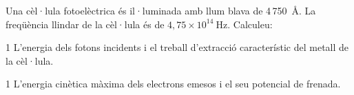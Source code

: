 Una cèl·lula fotoelèctrica és il·luminada amb llum blava de 4\,750~Å. La freqüència llindar de la cèl·lula és de $4,75\times 10^{14}\ \mathrm{Hz}$. Calculeu:

\begin{apartat}{1}
L'energia dels fotons incidents i el treball d'extracció característic del metall de la cèl·lula.
\end{apartat}

\begin{apartat}{1}
L'energia cinètica màxima dels electrons emesos i el seu potencial de frenada.
\end{apartat}

